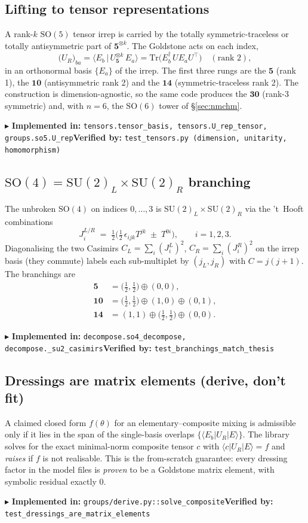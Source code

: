 \documentclass[11pt]{article}
\newcommand{\SO}[1]{\mathrm{SO}(#1)}
\newcommand{\SU}[1]{\mathrm{SU}(#1)}
\newcommand{\Tr}{\mathrm{Tr}}
\newcommand{\half}{\tfrac12}
\newcommand{\code}[1]{\texttt{#1}}
\newcommand{\impl}[2]{\par\smallskip\noindent\textcolor{blue!60!black}{\small$\blacktriangleright$ \textbf{Implemented in:} \code{#1}\quad\textbf{Verified by:} \code{#2}}\par\smallskip}
\begin{document}
\subsection{Lifting to tensor representations}
A rank-$k$ $\SO5$ tensor irrep is carried by the totally symmetric-traceless or totally
antisymmetric part of $\mathbf 5^{\otimes k}$. The Goldstone acts on each index,
\begin{equation}
  \big(U_R\big)_{b a}=\big\langle E_b \,\big|\, U_{\mathbf 5}^{\otimes k}\,E_a\big\rangle
  = \Tr\!\big(E_b^{\dagger}\,U E_a U^{\!\top}\big)\quad(\text{rank }2),
  \label{eq:lift}
\end{equation}
in an orthonormal basis $\{E_a\}$ of the irrep. The first three rungs are the
$\mathbf 5$ (rank 1), the $\mathbf{10}$ (antisymmetric rank 2) and the $\mathbf{14}$
(symmetric-traceless rank 2). The construction is dimension-agnostic, so the same code produces
the $\mathbf{30}$ (rank-3 symmetric) and, with $n=6$, the $\SO6$ tower of \S\ref{sec:nmchm}.
\impl{tensors.tensor\_basis, tensors.U\_rep\_tensor, groups.so5.U\_rep}{test\_tensors.py (dimension, unitarity, homomorphism)}

\subsection{\texorpdfstring{$\SO4=\SU2_L\times\SU2_R$}{SO(4)=SU(2)xSU(2)} branching}
The unbroken $\SO4$ on indices $0,\dots,3$ is $\SU2_L\times\SU2_R$ via the 't~Hooft combinations
\begin{equation}
  J^{L/R}_i \;=\; \half\Big(\tfrac12\,\epsilon_{ijk}T^{jk}\;\pm\;T^{0i}\Big),\qquad i=1,2,3 .
\end{equation}
Diagonalising the two Casimirs $C_{L}=\sum_i (J^L_i)^2$, $C_{R}=\sum_i (J^R_i)^2$ on the irrep
basis (they commute) labels each sub-multiplet by $(j_L,j_R)$ with $C=j(j+1)$. The branchings are
\begin{align}
  \mathbf 5 &= \big(\tfrac12,\tfrac12\big)\oplus(0,0),\\
  \mathbf{10} &= \big(\tfrac12,\tfrac12\big)\oplus(1,0)\oplus(0,1),\\
  \mathbf{14} &= (1,1)\oplus\big(\tfrac12,\tfrac12\big)\oplus(0,0).
\end{align}
\impl{decompose.so4\_decompose, decompose.\_su2\_casimirs}{test\_branchings\_match\_thesis}

\subsection{Dressings are matrix elements (derive, don't fit)}
A claimed closed form $f(\theta)$ for an elementary--composite mixing is admissible only if it lies
in the span of the single-basis overlaps $\{\langle E_b|U_R|E\rangle\}$. The library solves for the
exact minimal-norm composite tensor $c$ with $\langle c|U_R|E\rangle=f$ and \emph{raises} if $f$ is
not realisable. This is the from-scratch guarantee: every dressing factor in the model files is
\emph{proven} to be a Goldstone matrix element, with symbolic residual exactly $0$.
\impl{groups/derive.py::solve\_composite}{test\_dressings\_are\_matrix\_elements}
\end{document}
